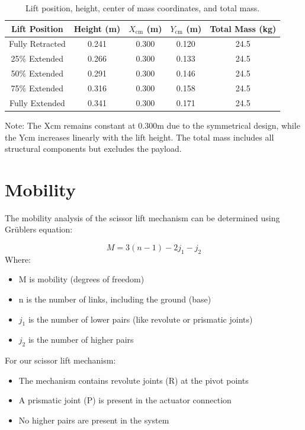 \documentclass[../../main]{subfiles}
\begin{document}
\begin{table}[h!]
  \centering
  
  \begin{tabular}{|c|c|c|c|c|}
      \hline \rowcolor{red!20}
      \textbf{Lift Position} & \textbf{Height (m)} & \textbf{$X_{\text{cm}}$ (m)} & \textbf{$Y_{\text{cm}}$ (m)} & \textbf{Total Mass (kg)} \\ \hline
      Fully Retracted & 0.241 & 0.300 & 0.120 & 24.5 \\ \hline
      25\% Extended & 0.266 & 0.300 & 0.133 & 24.5 \\ \hline
      50\% Extended & 0.291 & 0.300 & 0.146 & 24.5 \\ \hline
      75\% Extended & 0.316 & 0.300 & 0.158 & 24.5 \\ \hline
      Fully Extended & 0.341 & 0.300 & 0.171 & 24.5 \\ \hline
  \end{tabular}
\caption{Lift position, height, center of mass coordinates, and total mass.}
\end{table}

Note: The Xcm remains constant at 0.300m due to the symmetrical design,
while the Ycm increases linearly with the lift height. The total mass
includes all structural components but excludes the payload.

\section{Mobility}

The mobility analysis of the scissor lift mechanism can be determined
using Grübler\textquotesingle s equation:

\begin{equation}
  M = 3(n - 1) - 2j_1 - j_2
\end{equation}
Where:

\begin{itemize}
\item
  M is mobility (degrees of freedom)
\item
  n is the number of links, including the ground (base)
\item
  $j_1$ is the number of lower pairs (like revolute or prismatic joints)
\item
  $j_2$ is the number of higher pairs
\end{itemize}

For our scissor lift mechanism:

\begin{itemize}
\item
  The mechanism contains revolute joints (R) at the pivot points
\item
  A prismatic joint (P) is present in the actuator connection
\item
  No higher pairs are present in the system
\end{itemize}
\end{document}
